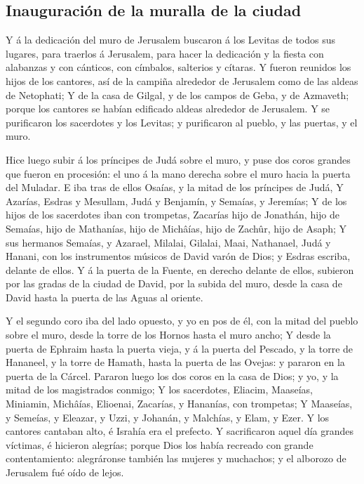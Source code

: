 \hypertarget{inauguraciuxf3n-de-la-muralla-de-la-ciudad}{%
\subsection{Inauguración de la muralla de la
ciudad}\label{inauguraciuxf3n-de-la-muralla-de-la-ciudad}}

 Y á la dedicación del muro de Jerusalem buscaron á los
Levitas de todos sus lugares, para traerlos á Jerusalem, para hacer la
dedicación y la fiesta con alabanzas y con cánticos, con címbalos,
salterios y cítaras.  Y fueron reunidos los hijos de los
cantores, así de la campiña alrededor de Jerusalem como de las aldeas de
Netophati;  Y de la casa de Gilgal, y de los campos de
Geba, y de Azmaveth; porque los cantores se habían edificado aldeas
alrededor de Jerusalem.  Y se purificaron los sacerdotes y
los Levitas; y purificaron al pueblo, y las puertas, y el muro.

 Hice luego subir á los príncipes de Judá sobre el muro, y
puse dos coros grandes que fueron en procesión: el uno á la mano derecha
sobre el muro hacia la puerta del Muladar.  E iba tras de
ellos Osaías, y la mitad de los príncipes de Judá,  Y
Azarías, Esdras y Mesullam,  Judá y Benjamín, y Semaías, y
Jeremías;  Y de los hijos de los sacerdotes iban con
trompetas, Zacarías hijo de Jonathán, hijo de Semaías, hijo de
Mathanías, hijo de Michâías, hijo de Zachûr, hijo de Asaph;
 Y sus hermanos Semaías, y Azarael, Milalai, Gilalai, Maai,
Nathanael, Judá y Hanani, con los instrumentos músicos de David varón de
Dios; y Esdras escriba, delante de ellos.  Y á la puerta de
la Fuente, en derecho delante de ellos, subieron por las gradas de la
ciudad de David, por la subida del muro, desde la casa de David hasta la
puerta de las Aguas al oriente.

 Y el segundo coro iba del lado opuesto, y yo en pos de él,
con la mitad del pueblo sobre el muro, desde la torre de los Hornos
hasta el muro ancho;  Y desde la puerta de Ephraim hasta la
puerta vieja, y á la puerta del Pescado, y la torre de Hananeel, y la
torre de Hamath, hasta la puerta de las Ovejas: y pararon en la puerta
de la Cárcel.  Pararon luego los dos coros en la casa de
Dios; y yo, y la mitad de los magistrados conmigo;  Y los
sacerdotes, Eliacim, Maaseías, Miniamin, Michâías, Elioenai, Zacarías, y
Hananías, con trompetas;  Y Maaseías, y Semeías, y Eleazar,
y Uzzi, y Johanán, y Malchías, y Elam, y Ezer. Y los cantores cantaban
alto, é Israhía era el prefecto.  Y sacrificaron aquel día
grandes víctimas, é hicieron alegrías; porque Dios los había recreado
con grande contentamiento: alegráronse también las mujeres y muchachos;
y el alborozo de Jerusalem fué oído de lejos.

